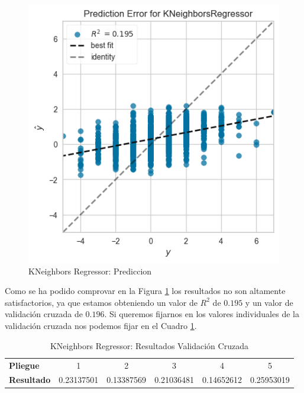 \begin{figure}[H]
    \centering
    \includegraphics[width=\smallSize]{images/linearModelkNeigh.png}
    \caption{KNeighbors Regressor: Prediccion}
    \label{Modelos-Lineales-kneigh-Evolucion-error}
\end{figure}

Como se ha podido comprovar en la Figura \ref{Modelos-Lineales-kneigh-Evolucion-error} los resultados no son altamente satisfactorios, ya que estamos obteniendo un valor de $R^2$ de $0.195$ y un valor de validación cruzada de $0.196$. Si queremos fijarnos en los valores individuales de la validación cruzada nos podemos fijar en el Cuadro \ref{Modelos-Lineales-kneigh-Validacion-Cruzada}.

\begin{table}[h]
    \centering
    \begin{tabular}{lccccc}
        \textbf{Pliegue} & 1 & 2 & 3 & 4 & 5 \\
        \textbf{Resultado} & 0.23137501 & 0.13387569 & 0.21036481 & 0.14652612 & 0.25953019
    \end{tabular}
    \caption{KNeighbors Regressor: Resultados Validación Cruzada}
    \label{Modelos-Lineales-kneigh-Validacion-Cruzada}
\end{table}